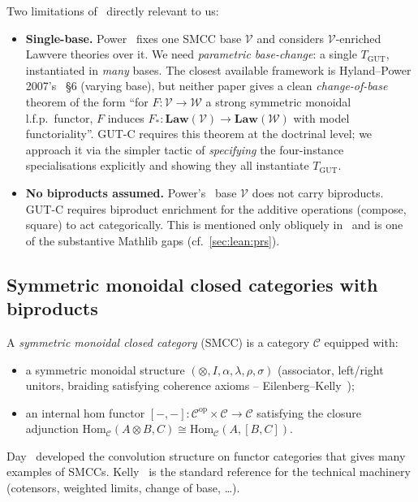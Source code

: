 \documentclass[11pt,a4paper]{article}
\theoremstyle{plain}
\theoremstyle{definition}
\theoremstyle{remark}
\newcommand{\cat}[1]{\mathbf{#1}}
\newcommand{\Hom}{\mathrm{Hom}}
\newcommand{\op}{\mathrm{op}}
\newcommand{\TGUT}{T_{\mathrm{GUT}}}
\newcommand{\smcc}{SMCC}
\begin{document}
Two limitations of~\cite{Pow99} directly relevant to us:

\begin{itemize}[leftmargin=*]
\item \textbf{Single-base.} Power~\cite{Pow99} fixes one \smcc{} base $\mathcal{V}$ and considers $\mathcal{V}$-enriched Lawvere theories over it. We need \emph{parametric base-change}: a single $\TGUT$, instantiated in \emph{many} bases. The closest available framework is Hyland--Power 2007's~\cite{HP07} \S6 (varying base), but neither paper gives a clean \emph{change-of-base} theorem of the form ``for $F : \mathcal{V} \to \mathcal{W}$ a strong symmetric monoidal l.f.p.\ functor, $F$ induces $F_* : \cat{Law}(\mathcal{V}) \to \cat{Law}(\mathcal{W})$ with model functoriality''. GUT-C requires this theorem at the doctrinal level; we approach it via the simpler tactic of \emph{specifying} the four-instance specialisations explicitly and showing they all instantiate $\TGUT$.

\item \textbf{No biproducts assumed.} Power's~\cite{Pow99} base $\mathcal{V}$ does not carry biproducts. GUT-C requires biproduct enrichment for the additive operations (compose, square) to act categorically. This is mentioned only obliquely in~\cite[\S6]{Pow99} and is one of the substantive Mathlib gaps (cf.\ \cref{sec:lean:prs}).
\end{itemize}

\subsection{Symmetric monoidal closed categories with biproducts}\label{sec:background:smcc}

A \emph{symmetric monoidal closed category} (\smcc) is a category $\mathcal{C}$ equipped with:

\begin{itemize}[leftmargin=*]
\item a symmetric monoidal structure $(\otimes, I, \alpha, \lambda, \rho, \sigma)$ (associator, left/right unitors, braiding satisfying coherence axioms -- Eilenberg--Kelly~\cite{EK66});
\item an internal hom functor $[-, -] : \mathcal{C}^{\op} \times \mathcal{C} \to \mathcal{C}$ satisfying the closure adjunction $\Hom_{\mathcal{C}}(A \otimes B, C) \cong \Hom_{\mathcal{C}}(A, [B, C])$.
\end{itemize}

Day~\cite{Day70} developed the convolution structure on functor categories that gives many examples of \smcc{}s. Kelly~\cite{Kel82} is the standard reference for the technical machinery (cotensors, weighted limits, change of base, \dots).
\end{document}
